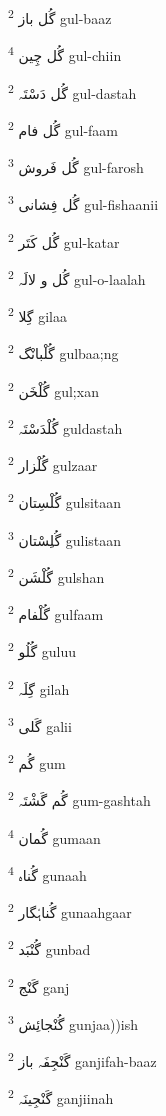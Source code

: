 \documentclass[12pt]{article}
\begin{document}
\begin{multicols}{5}
{\ur گُل باز}   \textsuperscript{2} gul-baaz

{\ur گُل چِین}   \textsuperscript{4} gul-chiin

{\ur گُل دَسْتَہ}   \textsuperscript{2} gul-dastah

{\ur گُل فام}   \textsuperscript{2} gul-faam

{\ur گُل فَروش}   \textsuperscript{3} gul-farosh

{\ur گُل فِشانی}   \textsuperscript{3} gul-fishaanii

{\ur گُل کَتَر}   \textsuperscript{2} gul-katar

{\ur گُل و لالَہ}   \textsuperscript{2} gul-o-laalah

{\ur گِلا}   \textsuperscript{2} gilaa

{\ur گُلْبانْگ}   \textsuperscript{2} gulbaa;ng

{\ur گُلْخَن}   \textsuperscript{2} gul;xan

{\ur گُلْدَسْتَہ}   \textsuperscript{2} guldastah

{\ur گُلْزار}   \textsuperscript{2} gulzaar

{\ur گُلْسِتان}   \textsuperscript{2} gulsitaan

{\ur گُلِسْتان}   \textsuperscript{3} gulistaan

{\ur گُلْشَن}   \textsuperscript{2} gulshan

{\ur گُلْفام}   \textsuperscript{2} gulfaam

{\ur گُلُو}   \textsuperscript{2} guluu

{\ur گِلَہ}   \textsuperscript{2} gilah

{\ur گَلی}   \textsuperscript{3} galii

{\ur گُم}   \textsuperscript{2} gum

{\ur گُم گَشْتَہ}   \textsuperscript{2} gum-gashtah

{\ur گُمان}   \textsuperscript{4} gumaan

{\ur گُناہ}   \textsuperscript{4} gunaah

{\ur گُناہْگار}   \textsuperscript{2} gunaahgaar

{\ur گُنْبَد}   \textsuperscript{2} gunbad

{\ur گَنْج}   \textsuperscript{2} ganj

{\ur گُنْجائِش}   \textsuperscript{3} gunjaa))ish

{\ur گَنْجِفَہ باز}   \textsuperscript{2} ganjifah-baaz

{\ur گَنْجِینَہ}   \textsuperscript{2} ganjiinah


\end{multicols}
\end{document}
